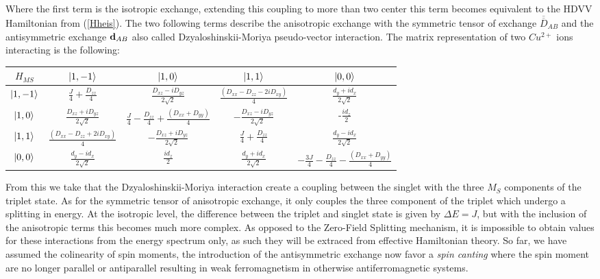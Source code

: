 \documentclass{article}
\begin{document}
Where the first term is the isotropic exchange, extending this coupling to more than two center this term becomes equivalent to the HDVV Hamiltonian from (\ref{Hheis}).%
The two following terms describe the anisotropic exchange with the symmetric tensor of exchange $\overline{\overline{D}}_{AB}$ and the antisymmetric exchange $\vb{d}_{AB}$ also called Dzyaloshinskii-Moriya pseudo-vector interaction.
The matrix representation of two $Cu^{2+}$ ions interacting is the following:
\begin{center}
    \begin{tabular}{c | c c c c}
        $H_{MS}$ & $\ket{1,-1}$ & $\ket{1,0}$ & $\ket{1,1}$ & $\ket{0,0}$\\
        \hline
        $\ket{1,-1}$ & $\frac{J}{4}+\frac{D_{zz}}{4}$ & $\frac{D_{xz}-iD_{yz}}{2\sqrt{2}}$ & $\frac{(D_{xx}-D_{zz}-2iD_{xy})}{4} $& $\frac{d_y+id_x}{2\sqrt{2}}$\\
        $\ket{1,0}$ & $\frac{D_{xz}+iD_{yz}}{2\sqrt{2}}$ &$ \frac{J}{4} -\frac{D_{zz}}{4} +\frac{(D_{xx}+D_{yy})}{4}$& $-\frac{D_{xz}-iD_{yz}}{2\sqrt{2}}$ & -$\frac{id_z}{2}$ \\
        $\ket{1,1}$ &$\frac{(D_{xx}-D_{zz}+2iD_{xy})}{4} $ & $-\frac{D_{xz}+iD_{yz}}{2\sqrt{2}}$ & $\frac{J}{4}+\frac{D_{zz}}{4}$ & $\frac{d_y-id_x}{2\sqrt{2}}$\\
        $\ket{0,0}$ & $\frac{d_y-id_x}{2\sqrt{2}}$  & $\frac{id_z}{2}$  &$\frac{d_y+id_x}{2\sqrt{2}}$  & $-\frac{3J}{4}-\frac{D_{zz}}{4}-\frac{(D_{xx}+D_{yy})}{4}$\\
    \end{tabular}
\end{center}
From this we take that the Dzyaloshinskii-Moriya interaction create a coupling between the singlet with the three $M_S$ components of the triplet state.
As for the symmetric tensor of anisotropic exchange, it only couples the three component of the triplet which undergo a splitting in energy.
At the isotropic level, the difference between the triplet and singlet state is given by $\Delta E=J$, but with the inclusion of the anisotropic terms this becomes much more complex. 
As opposed to the Zero-Field Splitting mechanism, it is impossible to obtain values for these interactions from the energy spectrum only, as such they will be extraced from effective Hamiltonian theory.
So far, we have assumed the colinearity of spin moments, the introduction of the antisymmetric exchange now favor a \textit{spin canting} where the spin moment are no longer parallel or antiparallel resulting in weak ferromagnetism in otherwise antiferromagnetic systems.
\end{document}
